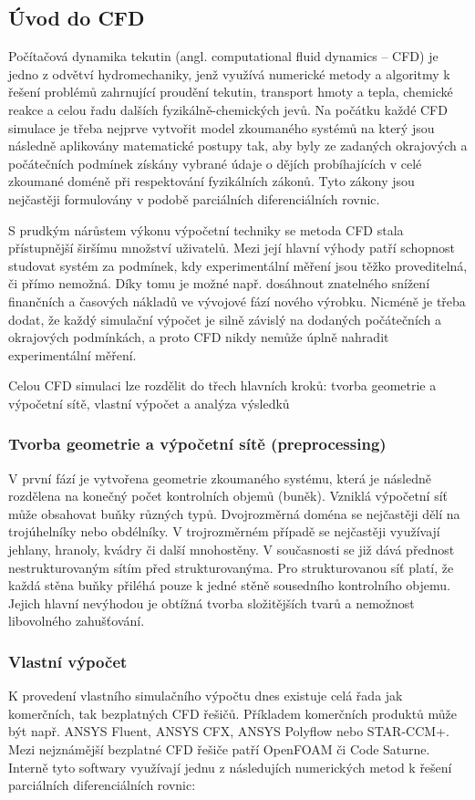 \subsection{Úvod do CFD}
Počítačová dynamika tekutin (angl. computational fluid dynamics -- CFD) je jedno z odvětví hydromechaniky, jenž využívá numerické metody a algoritmy k řešení problémů zahrnující proudění tekutin, transport hmoty a tepla, chemické reakce a celou řadu dalších fyzikálně-chemických jevů. Na počátku každé CFD simulace je třeba nejprve vytvořit model zkoumaného systémů na který jsou následně aplikovány matematické postupy tak, aby byly ze zadaných okrajových a počátečních podmínek získány vybrané údaje o dějích probíhajících v celé zkoumané doméně při respektování fyzikálních zákonů. Tyto zákony jsou nejčastěji formulovány v podobě parciálních diferenciálních rovnic. 

S prudkým nárůstem výkonu výpočetní techniky se metoda CFD stala přístupnější širšímu množství uživatelů. Mezi její hlavní výhody patří schopnost studovat systém za podmínek, kdy experimentální měření jsou těžko proveditelná, či přímo nemožná. Díky tomu je možné např. dosáhnout znatelného snížení finančních a časových nákladů ve vývojové fází nového výrobku. Nicméně je třeba dodat, že každý simulační výpočet je silně závislý na dodaných počátečních a okrajových podmínkách, a proto CFD nikdy nemůže úplně nahradit experimentální měření.

Celou CFD simulaci lze rozdělit do třech hlavních kroků: tvorba geometrie a výpočetní sítě, vlastní výpočet a analýza výsledků

\subsubsection{Tvorba geometrie a výpočetní sítě (preprocessing)}
V první fází je vytvořena geometrie zkoumaného systému, která je následně rozdělena na konečný počet kontrolních objemů (buněk). Vzniklá výpočetní síť může obsahovat buňky různých typů. Dvojrozměrná doména se nejčastěji dělí na trojúhelníky nebo obdélníky. V trojrozměrném případě se nejčastěji využívají jehlany, hranoly, kvádry či další mnohostěny. V současnosti se již dává přednost nestrukturovaným sítím před strukturovanýma. Pro strukturovanou síť platí, že každá stěna buňky přiléhá pouze k jedné stěně sousedního kontrolního objemu. Jejich hlavní nevýhodou je obtížná tvorba složitějších tvarů a nemožnost libovolného zahušťování.

\subsubsection{Vlastní výpočet}
K provedení vlastního simulačního výpočtu dnes existuje celá řada jak komerčních, tak bezplatných CFD řešičů. Příkladem komerčních produktů může být např. ANSYS Fluent, ANSYS CFX,  ANSYS Polyflow nebo STAR-CCM+. Mezi nejznámější bezplatné CFD řešiče patří OpenFOAM či Code Saturne. Interně tyto softwary využívají jednu z následujích numerických metod k řešení parciálních diferenciálních rovnic:

